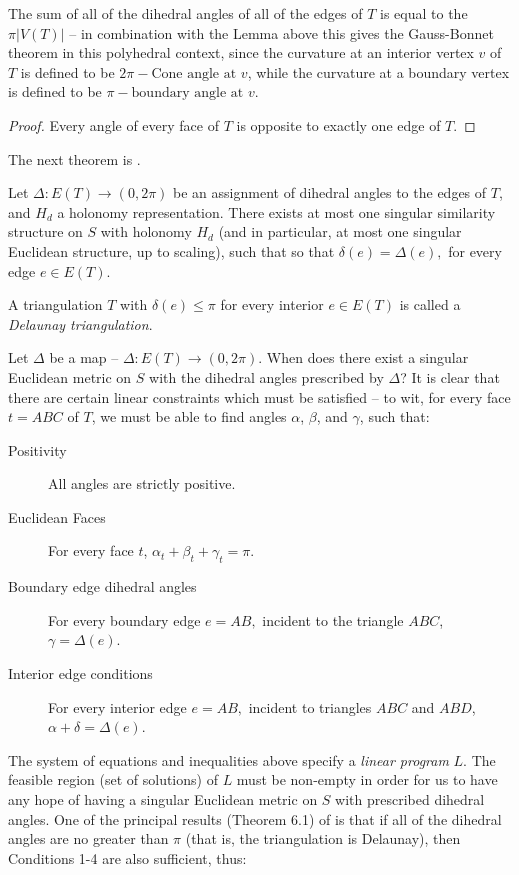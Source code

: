\documentclass{acmart}
\newcommand{\thm}[2]{\begin{#1} #2 \end{#1}}
\begin{document}
\thm{observation} 
{
\label{gaussbonnet}
The sum of all of the dihedral angles
of all of the edges of $T$ is equal to the $\pi |V(T)|$ -- in 
combination with the Lemma above this gives the Gauss-Bonnet theorem
in this polyhedral context, since the curvature at an interior vertex 
$v$ of $T$ is defined to be $2\pi - \mbox{Cone angle at $v$}$, while 
the curvature at a boundary vertex is defined to be $\pi -
\mbox{boundary angle at $v$}$. 
}

\thm{proof}
{
Every angle of every face of $T$ is opposite to exactly
one edge of $T$.
}

The next theorem is \cite[Theorem 6.16]{rvol}.
\thm{theorem}
{
\label{uniqueness}
Let $\Delta: E(T) \rightarrow (0, 2\pi)$ be an assignment of dihedral
angles to the edges of $T$, and $H_d$ a holonomy representation.
There exists at most one singular similarity structure 
on $S$ with holonomy $H_d$ (and in particular,  at most one
singular Euclidean structure, up to scaling),
such that  so that $\delta(e) = \Delta(e),$ for every edge
$e\in E(T)$.
}

\thm{definition}
{
A triangulation $T$ with $\delta(e) \leq \pi$
for every interior $e\in E(T)$ is called a \emph{Delaunay triangulation}.
}

Let $\Delta$ be a map --  $\Delta: E(T) \rightarrow (0, 2\pi).$ When
does there exist a singular Euclidean metric on $S$ with the
dihedral angles prescribed by $\Delta$? It is clear that there are
certain linear constraints which must be satisfied -- to wit,
for every face $t=ABC$ of $T$, we must be able to find angles
$\alpha$, $\beta$, and $\gamma$, such that:

\begin{description}

\item[Positivity] All angles are strictly positive.

\item[Euclidean Faces] For every face $t$, $\alpha_t + \beta_t +
  \gamma_t = \pi.$ 

\item[Boundary edge dihedral angles] For every boundary edge $e = AB,$
  incident to the triangle $ABC$, $\gamma = \Delta(e).$

\item[Interior edge conditions] For every interior edge $e = AB,$
  incident to  triangles $ABC$ and $ABD$, $\alpha+\delta = \Delta(e).$
\end{description}

The system of equations and inequalities above specify a \emph{linear
program} $L$. The feasible region  
(set of solutions) of $L$ must be non-empty in order for us to have
any hope of having a singular Euclidean metric on $S$ with
prescribed dihedral angles. One of the principal results (Theorem 6.1) 
of \cite{rvol} is that if all of the dihedral angles are no greater
than $\pi$ (that is, the triangulation is Delaunay), then Conditions
1-4 are also sufficient, thus:
\end{document}
